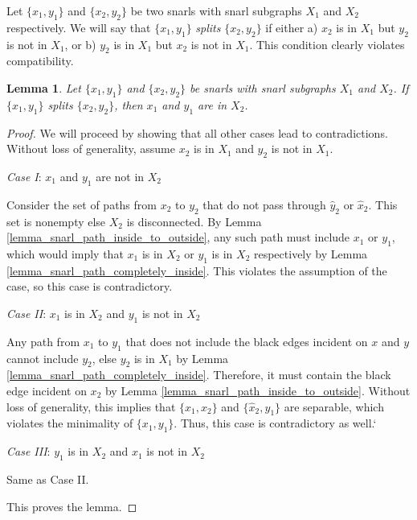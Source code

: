 \documentclass[11pt]{ucthesis}
\newtheorem{lemma}{Lemma}
\newtheorem*{proof}{Proof}
\begin{document}
Let $\{x_1, y_1\}$ and $\{x_2, y_2\}$ be two snarls with snarl subgraphs $X_1$ and $X_2$ respectively. We will say that $\{x_1, y_1\}$ \textit{splits} $\{x_2, y_2\}$ if either a) $x_2$ is in $X_1$ but $y_2$ is not in $X_1$, or b) $y_2$ is in $X_1$ but $x_2$ is not in $X_1$. This condition clearly violates compatibility.

\begin{lemma}
	Let $\{x_1, y_1\}$ and $\{x_2, y_2\}$ be snarls with snarl subgraphs $X_1$ and $X_2$. If $\{x_1, y_1\}$ splits $\{x_2, y_2\}$, then $x_1$ and $y_1$ are in $X_2$.
	\label{lemma_splits_implies_contained}
\end{lemma}
\begin{proof}
	We will proceed by showing that all other cases lead to contradictions. Without loss of generality, assume $x_2$ is in $X_1$ and $y_2$ is not in $X_1$.
	
	\noindent \textit{Case I}: $x_1$ and $y_1$ are not in $X_2$
	
	Consider the set of paths from $x_2$ to $y_2$ that do not pass through $\hat y_2$ or $\hat x_2$. This set is nonempty else $X_2$ is disconnected. By Lemma \ref{lemma_snarl_path_inside_to_outside}, any such path must include $x_1$ or $y_1$, which would imply that $x_1$ is in $X_2$ or $y_1$ is in $X_2$ respectively by Lemma \ref{lemma_snarl_path_completely_inside}. This violates the assumption of the case, so this case is contradictory.
		
	\noindent \textit{Case II}: $x_1$ is in $X_2$ and $y_1$ is not in $X_2$
	
	Any path from $x_1$ to $y_1$ that does not include the black edges incident on $x$ and $y$ cannot include $y_2$, else $y_2$ is in $X_1$ by Lemma \ref{lemma_snarl_path_completely_inside}. Therefore, it must contain the black edge incident on $x_2$ by Lemma \ref{lemma_snarl_path_inside_to_outside}. Without loss of generality, this implies that $\{x_1, x_2\}$ and $\{\hat x_2, y_1\}$  are separable, which violates the minimality of $\{x_1, y_1\}$. Thus, this case is contradictory as well.`
	
	\noindent \textit{Case III}: $y_1$ is in $X_2$ and $x_1$ is not in $X_2$
	
	Same as Case II.
	
	\noindent This proves the lemma.
\end{proof}
\end{document}
